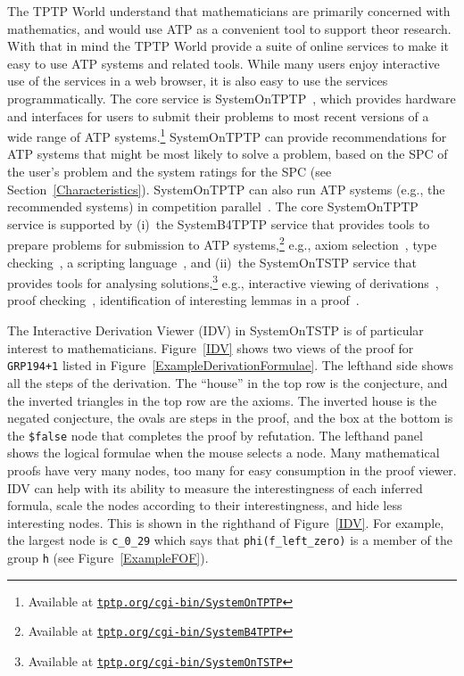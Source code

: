 \documentclass[runningheads]{llncs}
\begin{document}
The TPTP World understand that mathematicians are primarily concerned with mathematics, and would
use ATP as a convenient tool to support theor research.
With that in mind the TPTP World provide a suite of online services to make it easy to use ATP
systems and related tools.
While many users enjoy interactive use of the services in a web browser, it is also easy to use 
the services programmatically.
The core service is SystemOnTPTP~\cite{Sut00-CADE-17}, which provides hardware and interfaces 
for users to submit their problems to most recent versions of a wide range of ATP 
systems.\footnote{%
Available at \href{https://tptp.org/cgi-bin/SystemOnTPTP}{{\tt tptp.org/cgi-bin/SystemOnTPTP}}}
SystemOnTPTP can provide recommendations for ATP systems that might be most likely to solve
a problem, based on the SPC of the user's problem and the system ratings for the SPC
(see Section~\ref{Characteristics}).
SystemOnTPTP can also run ATP systems (e.g., the recommended systems) in competition
parallel~\cite{SS99-FLAIRS}.
The core SystemOnTPTP service is supported by (i)~the SystemB4TPTP service that provides tools to
prepare problems for submission to ATP systems,\footnote{%
Available at \href{https://tptp.org/cgi-bin/SystemB4TPTP}{{\tt tptp.org/cgi-bin/SystemB4TPTP}}}
e.g., axiom selection~\cite{HV11}, type 
checking~\cite{KSR16}, a scripting language~\cite{Sut14}, and (ii)~the SystemOnTSTP service that 
provides tools for analysing solutions,\footnote{%
Available at \href{https://tptp.org/cgi-bin/SystemOnTSTP}{{\tt tptp.org/cgi-bin/SystemOnTSTP}}} 
e.g., interactive viewing of derivations~\cite{TPS07}, proof checking~\cite{Sut06}, identification 
of interesting lemmas in a proof~\cite{PGS06}.

The Interactive Derivation Viewer (IDV) in SystemOnTSTP is of particular interest to mathematicians.
Figure~\ref{IDV} shows two views of the proof for {\tt GRP194+1} listed in 
Figure~\ref{ExampleDerivationFormulae}.
The lefthand side shows all the steps of the derivation.
The ``house'' in the top row is the conjecture, and the inverted triangles in the top row are the
axioms.
The inverted house is the negated conjecture, the ovals are steps in the proof, and the box at the
bottom is the {\tt \$false} node that completes the proof by refutation.
The lefthand panel shows the logical formulae when the mouse selects a node.
Many mathematical proofs have very many nodes, too many for easy consumption in the proof viewer.
IDV can help with its ability to measure the interestingness of each inferred formula, scale the
nodes according to their interestingness, and hide less interesting nodes.
This is shown in the righthand of Figure~\ref{IDV}.
For example, the largest node is {\tt c\_0\_29} which says that {\tt phi(f\_left\_zero)} is a 
member of the group {\tt h} (see Figure~\ref{ExampleFOF}).
\end{document}
